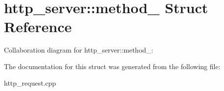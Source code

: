 \hypertarget{structhttp__server_1_1method__}{\section{http\-\_\-server\-:\-:method\-\_\- Struct Reference}
\label{structhttp__server_1_1method__}
}


Collaboration diagram for http\-\_\-server\-:\-:method\-\_\-\-:


The documentation for this struct was generated from the following file\-:\begin{DoxyCompactItemize}
\item 
http\-\_\-request.\-cpp\end{DoxyCompactItemize}
